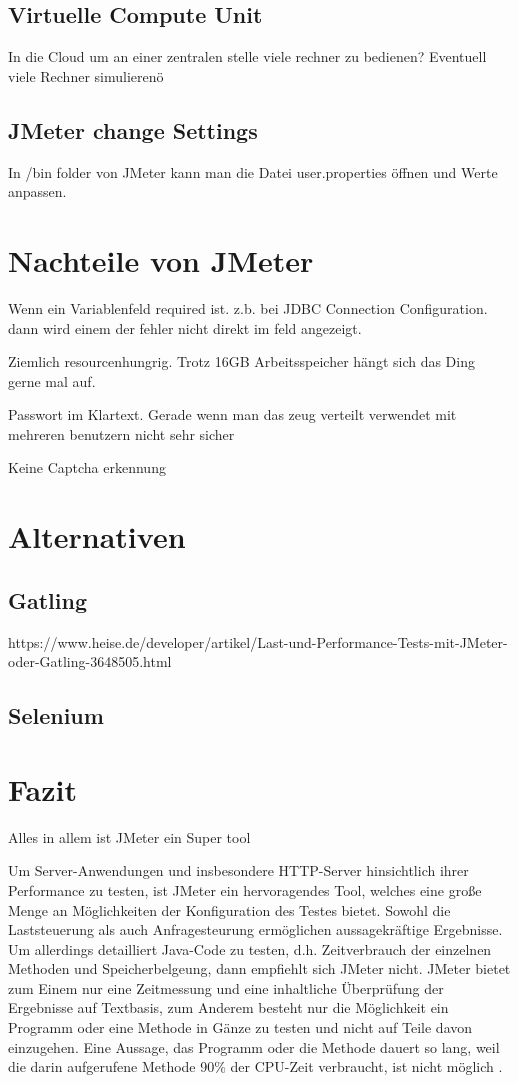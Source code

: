 \documentclass[a4paper,12pt]{article}
\begin{document}
\subsection{Virtuelle Compute Unit}
In die Cloud um an einer zentralen stelle viele rechner zu bedienen?
Eventuell viele Rechner simulierenö

\subsection{JMeter change Settings}
In /bin folder von JMeter kann man die Datei user.properties öffnen und Werte anpassen.

\section{Nachteile von JMeter}
Wenn ein Variablenfeld required ist. z.b. bei JDBC Connection Configuration. dann wird einem der fehler nicht direkt im feld angezeigt.

Ziemlich resourcenhungrig. Trotz 16GB Arbeitsspeicher hängt sich das Ding gerne mal auf.

Passwort im Klartext. Gerade wenn man das zeug verteilt verwendet mit mehreren benutzern nicht sehr sicher

Keine Captcha erkennung
\section{Alternativen}
\subsection{Gatling}
https://www.heise.de/developer/artikel/Last-und-Performance-Tests-mit-JMeter-oder-Gatling-3648505.html
\subsection{Selenium}

\section{Fazit}
Alles in allem ist JMeter ein Super tool

Um Server-Anwendungen und insbesondere HTTP-Server hinsichtlich ihrer Performance zu testen, ist JMeter ein hervoragendes Tool, welches eine große Menge an Möglichkeiten der Konfiguration des Testes bietet. Sowohl die Laststeuerung als auch Anfragesteurung ermöglichen aussagekräftige Ergebnisse. Um allerdings detailliert Java-Code zu testen, d.h. Zeitverbrauch der einzelnen Methoden und Speicherbelgeung, dann empfiehlt sich JMeter nicht. JMeter bietet zum Einem nur eine Zeitmessung und eine inhaltliche Überprüfung der Ergebnisse auf Textbasis, zum Anderem besteht nur die Möglichkeit ein Programm oder eine Methode in Gänze zu testen und nicht auf Teile davon einzugehen. Eine Aussage, das Programm oder die Methode dauert so lang, weil die darin aufgerufene Methode 90\% der CPU-Zeit verbraucht, ist nicht möglich \cite{online:performanceTools}.


\pagebreak
\thispagestyle{empty}


\end{document}
